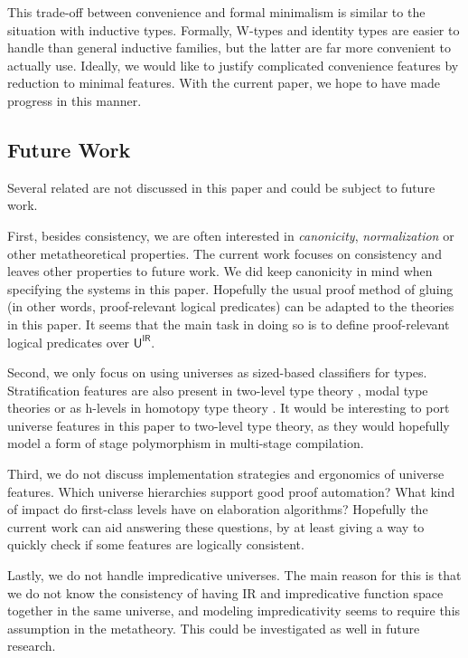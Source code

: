 \documentclass[a4paper,UKenglish,cleveref, autoref, thm-restate]{lipics-v2021}
\theoremstyle{remark}
\theoremstyle{definition}
\newcommand{\msf}[1]{\mathsf{#1}}
\newcommand{\uir}{\msf{U^{IR}}}
\begin{document}
This trade-off between convenience and formal minimalism is similar to the
situation with inductive types. Formally, W-types and identity types are easier
to handle than general inductive families, but the latter are far more
convenient to actually use. Ideally, we would like to justify complicated
convenience features by reduction to minimal features. With the current paper,
we hope to have made progress in this manner.

\subsection{Future Work}

Several related are not discussed in this paper and could be subject to future
work.

First, besides consistency, we are often interested in \emph{canonicity},
\emph{normalization} or other metatheoretical properties. The current work
focuses on consistency and leaves other properties to future work. We did keep
canonicity in mind when specifying the systems in this paper. Hopefully the
usual proof method of gluing (in other words, proof-relevant logical predicates)
\cite{kaposi2019gluing, sterling2019algebraic} can be adapted to the theories in
this paper. It seems that the main task in doing so is to define proof-relevant
logical predicates over $\uir$.

Second, we only focus on using universes as sized-based classifiers for
types. Stratification features are also present in two-level type theory
\cite{twolevel}, modal type theories \cite{gratzer20multimodal} or as h-levels
in homotopy type theory \cite{hottbook}. It would be interesting to port
universe features in this paper to two-level type theory, as they would
hopefully model a form of stage polymorphism in multi-stage compilation.

Third, we do not discuss implementation strategies and ergonomics of universe
features. Which universe hierarchies support good proof automation? What kind of
impact do first-class levels have on elaboration algorithms? Hopefully the
current work can aid answering these questions, by at least giving a way to quickly
check if some features are logically consistent.

Lastly, we do not handle impredicative universes. The main reason for this is
that we do not know the consistency of having IR and impredicative function
space together in the same universe, and modeling impredicativity seems to
require this assumption in the metatheory. This could be investigated as well
in future research.



\end{document}
